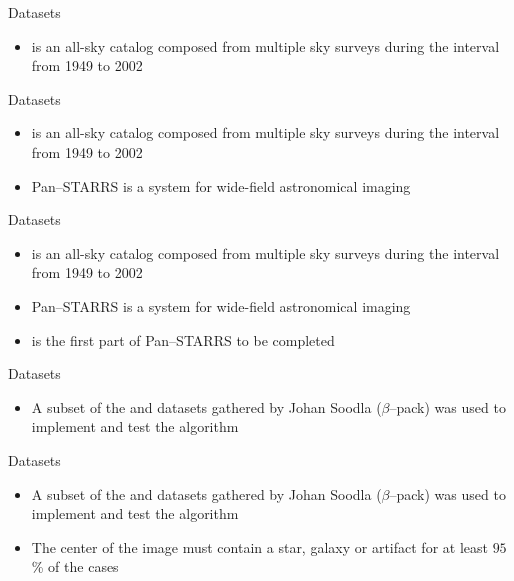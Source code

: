 \begin{frame}{Datasets}
    \begin{itemize}
        \item \usno is an all-sky catalog composed from multiple sky surveys during the interval from 1949 to 2002 \cite{web:caltech:usno}
    \end{itemize}
\end{frame}

\begin{frame}{Datasets}
    \begin{itemize}
        \item \usno is an all-sky catalog composed from multiple sky surveys during the interval from 1949 to 2002 \cite{web:caltech:usno}
        \item Pan--STARRS is a system for wide-field astronomical imaging
    \end{itemize}
\end{frame}

\begin{frame}{Datasets}
    \begin{itemize}
        \item \usno is an all-sky catalog composed from multiple sky surveys during the interval from 1949 to 2002 \cite{web:caltech:usno}
        \item Pan--STARRS is a system for wide-field astronomical imaging
        \item \panstarrs is the first part of Pan--STARRS to be completed
    \end{itemize}
\end{frame}

\begin{frame}{Datasets}
    \begin{itemize}
        \item A subset of the \usno and \panstarrs datasets gathered by Johan Soodla ($\beta$--pack) was used to implement and test the algorithm
    \end{itemize}
\end{frame}

\begin{frame}{Datasets}
    \begin{itemize}
        \item A subset of the \usno and \panstarrs datasets gathered by Johan Soodla ($\beta$--pack) was used to implement and test the algorithm
        \item The center of the image must contain a star, galaxy or artifact for at least $95$\% of the cases
    \end{itemize}
\end{frame}

